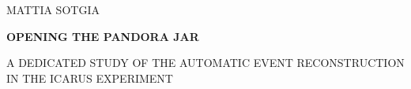 \begin{titlepage}
    \ifdraft\BgThispage\fi
    \setlength{\parindent}{0pt}
    \color{white}

    \phantom{.}
    \vfill

    \dusffamily
    
    \fontsize{12}{12}\selectfont 
    MATTIA SOTGIA
    
    {
        \fontsize{45}{45}\selectfont
        \bfseries
        OPENING THE PANDORA JAR\par
        
        \vspace{1em}
        
        \fontsize{15}{25}\selectfont 
        A DEDICATED STUDY OF THE AUTOMATIC EVENT RECONSTRUCTION IN THE ICARUS EXPERIMENT
    }
\end{titlepage}
